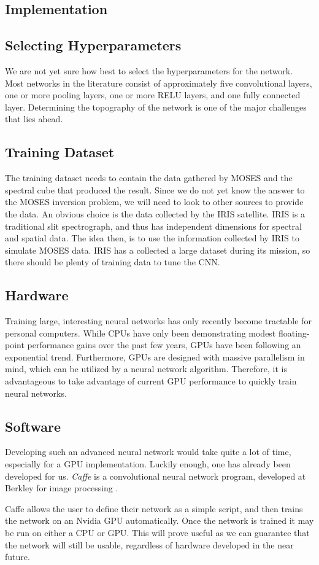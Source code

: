 \documentclass[twoside]{article}
\begin{document}
\begin{multicols}{2}
\section{Implementation}
\subsection{Selecting Hyperparameters}
We are not yet sure how best to select the hyperparameters for the network. Most networks in the literature consist of approximately five convolutional layers, one or more pooling layers, one or more RELU layers, and one fully connected layer. Determining the topography of the network is one of the major challenges that lies ahead.
\subsection{Training Dataset}
The training dataset needs to contain the data gathered by MOSES and the spectral cube that produced the result. Since we do not yet know the answer to the MOSES inversion problem, we will need to look to other sources to provide the data. An obvious choice is the data collected by the IRIS satellite. IRIS is a traditional slit spectrograph, and thus has independent dimensions for spectral and spatial data. The idea then, is to use the information collected by IRIS to simulate MOSES data. IRIS has a collected a large dataset during its mission, so there should be plenty of training data to tune the CNN.
\subsection{Hardware}
Training large, interesting neural networks has only recently become tractable for personal computers. While CPUs have only been demonstrating modest floating-point performance gains over the past few years, GPUs have been following an exponential trend. Furthermore, GPUs are designed with massive parallelism in mind, which can be utilized by a neural network algorithm. Therefore, it is advantageous to take advantage of current GPU performance to quickly train neural networks. 

\subsection{Software}
Developing such an advanced neural network would take quite a lot of time, especially for a GPU implementation. Luckily enough, one has already been developed for us. \textit{Caffe} is a convolutional neural network program, developed at Berkley for image processing \cite{caffe}. \par Caffe allows the user to define their network as a simple script, and then trains the network on an Nvidia GPU automatically. Once the network is trained it may be run on either a CPU or GPU. This will prove useful as we can guarantee that the network will still be usable, regardless of hardware developed in the near future.

\end{multicols}

	
	
\end{document}
